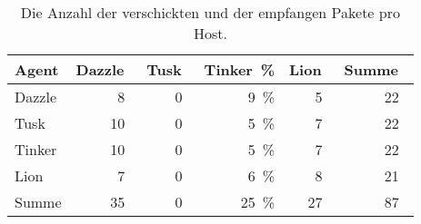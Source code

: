 \begin{table}
\centering
\begin{tabular}{l%
 r<{\,}%
 r<{\,}%
 r<{\,\%}%
 r<{\,}%
 r<{\,}%
}
Agent  				& Dazzle	& Tusk		& Tinker	& Lion		& Summe		\\
\hline
Dazzle 				& 8		& 0		& 9		& 5		& 22		\\
Tusk 				& 10		& 0		& 5		& 7		& 22		\\
Tinker				& 10		& 0		& 5		& 7		& 22		\\
Lion				& 7		& 0		& 6		& 8		& 21		\\ 
Summe				& 35		& 0		& 25 		& 27		& 87		\\
\end{tabular}
\caption{Die Anzahl der verschickten und der empfangen Pakete pro Host.}
\label{tab:VerschickteDaten2000Mb}
\end{table}



